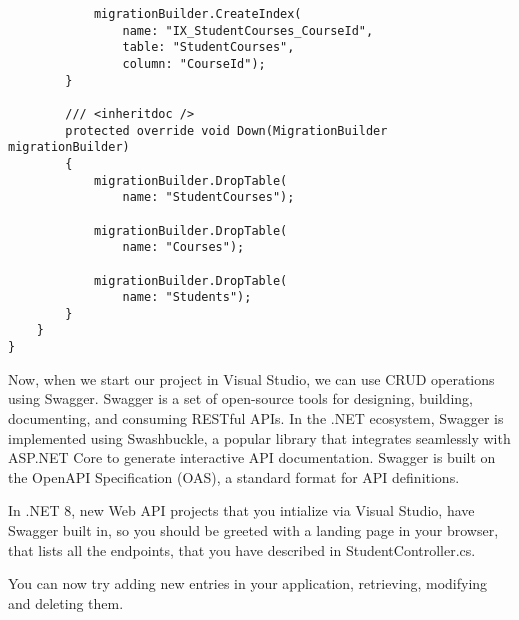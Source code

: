 \begin{lstlisting}
            migrationBuilder.CreateIndex(
                name: "IX_StudentCourses_CourseId",
                table: "StudentCourses",
                column: "CourseId");
        }

        /// <inheritdoc />
        protected override void Down(MigrationBuilder migrationBuilder)
        {
            migrationBuilder.DropTable(
                name: "StudentCourses");

            migrationBuilder.DropTable(
                name: "Courses");

            migrationBuilder.DropTable(
                name: "Students");
        }
    }
}
\end{lstlisting}

Now, when we start our project in Visual Studio, we can use CRUD operations using Swagger. Swagger is a set of open-source tools for 
designing, building, documenting, and consuming RESTful APIs. In the .NET ecosystem, Swagger is implemented using Swashbuckle, a popular 
library that integrates seamlessly with ASP.NET Core to generate interactive API documentation. Swagger is built on the OpenAPI Specification 
(OAS), a standard format for API definitions.

In .NET 8, new Web API projects that you intialize via Visual Studio, have Swagger built in, so you should be greeted with a landing page in your browser, that lists all the endpoints, that you have described in StudentController.cs.

You can now try adding new entries in your application, retrieving, modifying and deleting them.


\begin{lstlisting}

\end{lstlisting}



